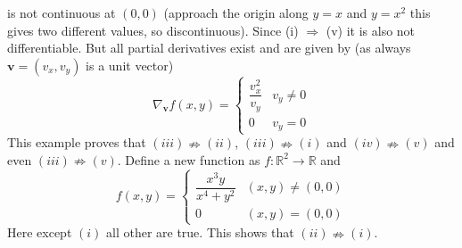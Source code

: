 \documentclass[11pt]{beamer}
\begin{document}
\begin{frame}
is not continuous at $(0,0)$ (approach the origin along $y=x$ and $y=x^2$ this gives two different values, so discontinuous). Since (i) $\Rightarrow$ (v) it is also not differentiable. But all partial derivatives exist and are given by (as always $\textbf{v}=(v_x,v_y)$ is a unit vector)
$$\nabla_{\textbf{v}}f(x,y)= \begin{cases} 
      \dfrac{v_x^2}{v_y} & v_y\neq 0\\
      0 & v_y= 0
   \end{cases}$$
This example proves that $(iii)\nRightarrow (ii)$, $(iii)\nRightarrow (i)$ and $(iv)\nRightarrow (v)$ and even $(iii)\nRightarrow(v)$. Define a new function as $f:\mathbb{R}^2\to\mathbb{R}$ and
\[f(x,y)= \begin{cases} 
      \dfrac{x^3y}{x^4+y^2} & (x,y)\neq (0,0) \\
      0 & (x,y)= (0,0)
   \end{cases}
\]
Here except $(i)$ all other are true. This shows that $(ii)\nRightarrow (i)$.
\end{frame}
\end{document}
